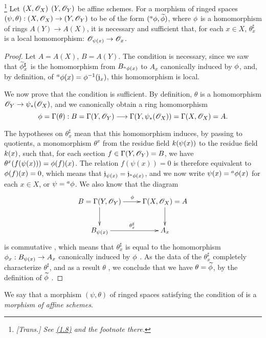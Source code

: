 \begin{theorem}[1.7.3]
\label{I.1.7.3}
\footnote{\emph{[Trans.] See \hyperref[subsection:I.1.8]{(1.8)} and the footnote there.}}
Let $(X,\mathscr{O}_X)$  $(Y,\mathscr{O}_Y)$ be affine schemes.
For a morphism of ringed spaces $(\psi,\theta):(X,\sh{O}_X)\to(Y,\sh{O}_Y)$ to be of the form $({}^a\phi,\widetilde{\phi})$, where $\phi$ is a homomorphism of rings $A(Y)\to A(X)$, it is necessary and sufficient that, for each $x\in X$, $\theta_x^\sharp$ is a local homomorphism: $\sh{O}_{\psi(x)}\to\sh{O}_x$.
\end{theorem}

\begin{proof}
Let $A=A(X)$, $B=A(Y)$.
The condition is necessary, since we saw  that $\widetilde{\phi}_x^\sharp$ is the homomorphism from $B_{{}^a\phi(x)}$ to $A_x$ canonically induced by $\phi$, and, by definition, of ${}^a\phi(x)=\phi^{-1}(\mathfrak{j}_x)$, this homomorphism is local.

We now prove that the condition is sufficient.
By definition, $\theta$ is a homomorphism $\sh{O}_Y\to\psi_*(\sh{O}_X)$, and we canonically obtain a ring homomorphism
\[
  \vphi=\Gamma(\theta):B=\Gamma(Y,\sh{O}_Y)
  \to\Gamma(Y,\psi_*(\sh{O}_X))=\Gamma(X,\sh{O}_X)=A.
\]

The hypotheses on $\theta_x^\sharp$ mean that this homomorphism induces, by passing to quotients, a monomorphism $\theta^x$ from the residue field $k(\psi(x))$ to the residue field $k(x)$, such that, for each section $f\in\Gamma(Y,\mathscr{O}_Y)=B$, we have $\theta^x(f(\psi(x)))=\phi(f)(x)$.
The relation $f(\psi(x))=0$ is therefore equivalent to $\phi(f)(x)=0$, which means that $\mathfrak{j}_{\psi(x)}=\mathfrak{j}_{{}^a\phi(x)}$, and we now write $\psi(x)={}^a\phi(x)$ for each $x\in X$, or $\psi={}^a\phi$.
We also know that the diagram
\[
  \xymatrix{
    B=\Gamma(Y,\sh{O}_Y)\ar[r]^\vphi\ar[d] &
    \Gamma(X,\sh{O}_X)=A\ar[d]\\
    B_{\psi(x)}\ar[r]^{\theta_x^\sharp} &
    A_x
  }
\]
is commutative , which means that $\theta_x^\sharp$ is equal to the homomorphism $\vphi_x:B_{\psi(x)}\to A_x$ canonically induced by $\phi$ .
As the data of the $\theta_x^\sharp$ completely characterize $\theta^\sharp$, and as a result $\theta$ , we conclude that we have $\theta=\widetilde{\phi}$, by the definition of $\widetilde{\phi}$ .
\end{proof}

We say that a morphism $(\psi,\theta)$ of ringed spaces satisfying the condition of  is a \emph{morphism of affine schemes}.


